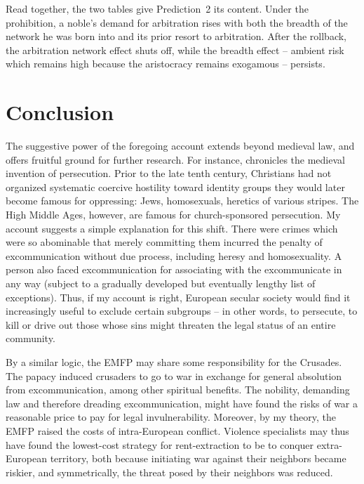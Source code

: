 \documentclass[12pt]{article}
\theoremstyle{definition}
\theoremstyle{remark}
\begin{document}
Read together, the two tables give Prediction~2 its content. Under the prohibition, a noble's demand for arbitration rises with both the breadth of the network he was born into and its prior resort to arbitration. After the rollback, the arbitration network effect shuts off, while the breadth effect -- ambient risk which remains high because the aristocracy remains exogamous -- persists.


\section{Conclusion}

The suggestive power of the foregoing account extends beyond medieval law, and offers fruitful ground for further research. For instance, \citet{moore_1987} chronicles the medieval invention of persecution. Prior to the late tenth century, Christians had not organized systematic coercive hostility toward identity groups they would later become famous for oppressing: Jews, homosexuals, heretics of various stripes. The High Middle Ages, however, are famous for church-sponsored persecution. My account suggests a simple explanation for this shift. There were crimes which were so abominable that merely committing them incurred the penalty of excommunication without due process, including heresy and homosexuality. A person also faced excommunication for associating with the excommunicate in any way (subject to a gradually developed but eventually lengthy list of exceptions). Thus, if my account is right, European secular society would find it increasingly useful to exclude certain subgroups -- in other words, to persecute, to kill or drive out those whose sins might threaten the legal status of an entire community.

By a similar logic, the EMFP may share some responsibility for the Crusades. The papacy induced crusaders to go to war in exchange for general absolution from excommunication, among other spiritual benefits. The nobility, demanding law and therefore dreading excommunication, might have found the risks of war a reasonable price to pay for legal invulnerability. Moreover, by my theory, the EMFP raised the costs of intra-European conflict. Violence specialists may thus have found the lowest-cost strategy for rent-extraction to be to conquer extra-European territory, both because initiating war against their neighbors became riskier, and symmetrically, the threat posed by their neighbors was reduced.
\end{document}
